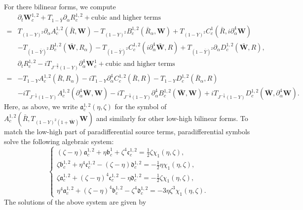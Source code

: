 \documentclass[10pt]{amsart}
\theoremstyle{remark}
\theoremstyle{definition}
\numberwithin{equation}{section}
\newcommand{\p}{\partial}
\newcommand{\al}{\alpha}
\newcommand{\f}{\frac}
\newcommand{\bw}{\mathbf{W}}
\begin{document}
For there bilinear forms, we compute
\begin{align*}
&\partial_t \bw^{1,2}_c+T_{1-\bar{Y}} \partial_\alpha R^{1,2}_c + \text{cubic and higher terms} \\
=& T_{(1-Y)^2}\partial_\alpha A^{1,2}_c(\bar{R}, \bw) -T_{(1-Y)^2}B^{1,2}_c(\bar{R}_\alpha, \bw) +  T_{(1-Y)^2}C^1_c(\bar{R}, i\p_\al^4\bw) \\
 &-T_{(1-\bar{Y})^2}B^{1,2}_c(\bar{\bw}, R_\alpha)- T_{(1-\bar{Y})^2}C^{1,2}_c(i\p_\al^4\bar{\bw}, R) + T_{(1-\bar{Y})^2}\partial_\alpha D^{1,2}_c(\bar{\bw}, R),\\
&\partial_t R^{1,2}_c  -iT_{J^{-\frac{3}{2}}(1-Y)}\p_\al^4 \bw^1_c+ \text{cubic and higher  terms} \\
=& -T_{1-Y}A^{1,2}_c(\bar{R}, R_\alpha) - iT_{1-Y}\partial_\alpha^4 C^{1,2}_c(\bar{R}, R) - T_{1-Y}D^{1,2}_c(\bar{R}_\alpha, R)\\
&- iT_{J^{-\frac{5}{2}}(1-Y)}A^{1,2}_c(\p_\al^4\bar{\bw}, \bw) -iT_{J^{-\frac{5}{2}}(1-Y)}\partial_\alpha^4 B^{1,2}_c(\bar{\bw}, \bw) +iT_{J^{-\frac{5}{2}}(1-Y)}D^{1,2}_c(\bar{\bw}, \p_\al^4\bw).
\end{align*}
Here, as above, we write $\mathfrak{a}^{1,2}_c(\eta, \zeta)$ for the symbol of  $A^{1,2}_{c} \left(\bar{R}, T_{(1-Y)^2(1+\bar{\bw})}\bw \right)$ and similarly for other low-high bilinear forms.
To match the low-high part of paradifferential source terms, paradifferential symbols solve the following algebraic system: 
\begin{equation*}
\begin{cases}
(\zeta-\eta)\mathfrak{a}^{1,2}_c+\eta\mathfrak{b}^1_c+\zeta^4\mathfrak{c}^{1,2}_c=\f12\zeta\chi_{1}(\eta,\zeta),\\
\zeta\mathfrak{b}^{1,2}_c+\eta^4\mathfrak{c}^{1,2}_c-(\zeta-\eta)\mathfrak{d}^{1,2}_c=-\f12\eta\chi_{1}(\eta,\zeta),\\
\zeta\mathfrak{a}^{1,2}_c+(\zeta-\eta)^4\mathfrak{c}^{1,2}_c-\eta\mathfrak{d}^{1,2}_c= -\f12\zeta\chi_{1}(\eta,\zeta),\\
\eta^4 \mathfrak{a}^{1,2}_c+(\zeta-\eta)^4\mathfrak{b}^{1,2}_c-\zeta^4\mathfrak{d}^{1,2}_c= -3\eta \zeta^3\chi_{1}(\eta,\zeta).
\end{cases}
\end{equation*}
The solutions of the above system are given by
\end{document}
